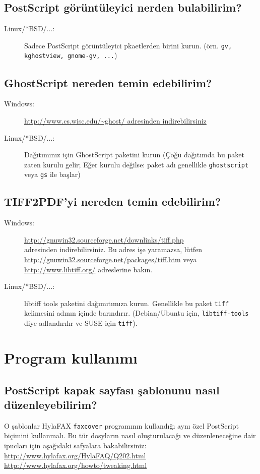 \documentclass[a4paper,10pt]{scrartcl}
\begin{document}
\subsection{PostScript görüntüleyici nerden bulabilirim?}
\begin{description}
\item[Linux/*BSD/...:] Sadece PostScript görüntüleyici pkaetlerden birini kurun.
		(örn. \texttt{gv, kghostview, gnome-gv, ...})


\end{description}

\subsection{GhostScript nereden temin edebilirim?}
\begin{description}
\item[Windows:] \url{http://www.cs.wisc.edu/~ghost/ adresinden indirebilirsiniz}
\item[Linux/*BSD/...:] Dağıtımınız için GhostScript paketini kurun (Çoğu dağıtımda bu paket zaten kurulu gelir; Eğer kurulu değilse: paket adı genellikle \texttt{ghostscript} veya \texttt{gs} ile başlar)
\end{description}

\subsection{TIFF2PDF'yi nereden temin edebilirim?}
\begin{description}
\item[Windows:] \url{http://gnuwin32.sourceforge.net/downlinks/tiff.php}\\ adresinden indirebilirsiniz. Bu adres işe yaramazsa, lütfen \url{http://gnuwin32.sourceforge.net/packages/tiff.htm} veya \url{http://www.libtiff.org/} adreslerine bakın.
\item[Linux/*BSD/...:] libtiff tools paketini dağımıtımıza kurun. Genellikle bu paket \texttt{tiff} kelimesini adının içinde barındırır. (Debian/Ubuntu için, \texttt{libtiff-tools} diye adlandırılır ve SUSE için \texttt{tiff}).
\end{description}

\section{Program kullanımı}

\subsection{PostScript kapak sayfası şablonunu nasıl düzenleyebilirim?}
O şablonlar HylaFAX \texttt{faxcover} programının kullandığı aynı özel PostScript biçimini kullanmalı.
Bu tür dosyların nasıl oluşturulacağı ve düzenleneceğine dair ipucları için aşağıdaki safyalara bakabilirsiniz:
\url{http://www.hylafax.org/HylaFAQ/Q202.html}\\
\url{http://www.hylafax.org/howto/tweaking.html}\\
\end{document}
